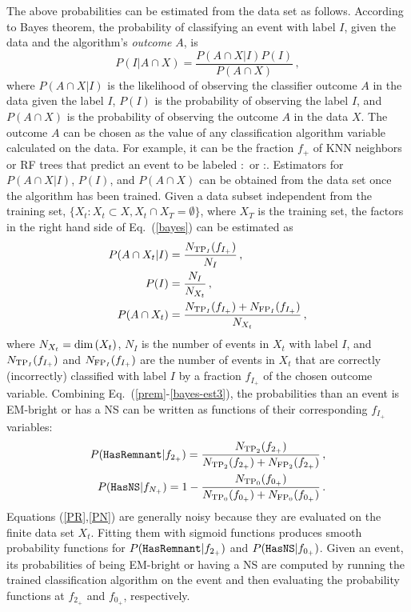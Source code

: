 The above probabilities can be estimated from the data set as follows. According to Bayes theorem, the probability of classifying an event with label $I$, given the data and the
algorithm's \emph{outcome} $A$, is
%
\begin{equation}
P(I|A \cap X)=\frac{P(A \cap X|I)P(I)}{P(A \cap X)}\,,
\label{bayes}
\end{equation}
%
where $P(A \cap X|I)$ is the likelihood of observing the classifier outcome $A$ in the data given the label $I$, $P(I)$ is the probability of observing the label $I$, and $P(A \cap X)$
is the probability of observing the outcome $A$ in the data $X$. The outcome $A$ can be chosen as the value of any classification algorithm variable calculated on the data. For
example, it can be the fraction $f_+$ of \ac{KNN} neighbors or \ac{RF} trees that predict an event to be labeled \hasns:\true\ or \hasrem:\true. Estimators for $P(A \cap X|I)$, $P(I)$, and $P(A \cap X)$ can be obtained from the data set once the algorithm has been trained. Given a data subset independent
from the training set, $\{X_t:X_t\subset X,X_t \cap X_T=\emptyset\}$, where $X_T$ is the training set, the factors in the right hand side of Eq.~(\ref{bayes}) can be estimated as 
%
\begin{align}
P(A \cap X_t|I)&=\frac{N_{{\rm TP}_I}(f_{I_+})}{N_I}\,,\label{bayes-est1}\\
P(I)&=\frac{N_I}{N_{X_t}}\,,\label{bayes-est2}\\
P(A \cap X_t)&=\frac{N_{{\rm TP}_I}(f_{I_+})+N_{{\rm FP}_I}(f_{I_+})}{N_{X_t}}\,,\label{bayes-est3}
\end{align}
%
where $N_{X_{t}}=\hbox{dim}\,(X_t)$, $N_{I}$ is the number of events in $X_t$ with label $I$, and $N_{{\rm TP}_I}(f_{I_+})$ and $N_{{\rm FP}_I}(f_{I_+})$ are the number of events in $X_t$ that are correctly (incorrectly) classified with label $I$ by a fraction $f_{I_+}$ of the chosen outcome variable. Combining Eq.~(\ref{prem}-\ref{bayes-est3}), the probabilities than an event is \ac{EM}-bright or has a \ac{NS} can be written as functions of their corresponding $f_{I_+}$ variables:
%
\begin{align}
P({{\tt HasRemnant}}|f_{2_+})=\frac{N_{{\rm TP}_2}(f_{2_+})}{N_{{\rm TP}_2}(f_{2_+})+N_{{\rm FP}_2}(f_{2_+})}\,,\label{PR}\\
P({{\tt HasNS}}|f_{N_+})=1-\frac{N_{{\rm TP}_0}(f_{0_+})}{N_{{\rm TP}_0}(f_{0_+})+N_{{\rm FP}_0}(f_{0_+})}\,.\label{PN}
\end{align}
%
 Equations (\ref{PR},\ref{PN}) are generally noisy because they are evaluated on the finite data set $X_t$. Fitting them with sigmoid functions produces smooth probability functions for $P({{\tt HasRemnant}}|f_{2_+})$ and $P({{\tt HasNS}}|f_{0_+})$. Given an event, its probabilities of being \ac{EM}-bright or having a \ac{NS} are computed by running the trained classification algorithm on the event and then evaluating the probability functions at $f_{2_+}$ and $f_{0_+}$, respectively.

